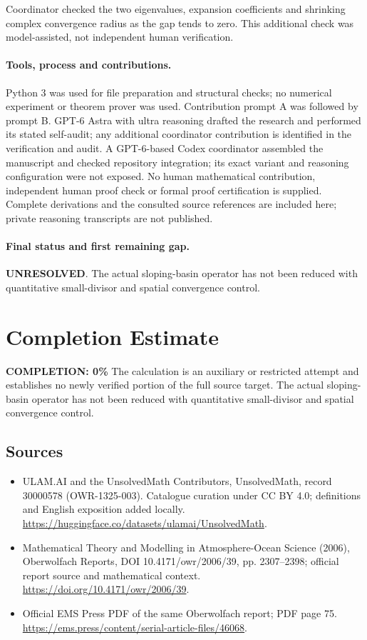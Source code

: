 \documentclass[11pt]{article}
\begin{document}
Coordinator checked the two eigenvalues, expansion coefficients and shrinking complex convergence radius as the gap tends to zero. This additional check was model-assisted, not independent human verification.

\paragraph{Tools, process and contributions.}
Python 3 was used for file preparation and structural checks; no numerical experiment or theorem prover was used. Contribution prompt A was followed by prompt B. GPT-6 Astra with ultra reasoning drafted the research and performed its stated self-audit; any additional coordinator contribution is identified in the verification and audit. A GPT-6-based Codex coordinator assembled the manuscript and checked repository integration; its exact variant and reasoning configuration were not exposed. No human mathematical contribution, independent human proof check or formal proof certification is supplied. Complete derivations and the consulted source references are included here; private reasoning transcripts are not published.

\paragraph{Final status and first remaining gap.}
\textbf{UNRESOLVED}. The actual sloping-basin operator has not been reduced with quantitative small-divisor and spatial convergence control.

\section{Completion Estimate}
\noindent\textbf{COMPLETION: 0\%}
The calculation is an auxiliary or restricted attempt and establishes no newly verified portion of the full source target. The actual sloping-basin operator has not been reduced with quantitative small-divisor and spatial convergence control.

\subsection{Sources}
\begin{itemize}
\item[\hypertarget{source:30000578:1}{S1}] ULAM.AI and the UnsolvedMath Contributors, UnsolvedMath, record 30000578 (OWR-1325-003). Catalogue curation under CC BY 4.0; definitions and English exposition added locally.
\url{https://huggingface.co/datasets/ulamai/UnsolvedMath}.
\item[\hypertarget{source:30000578:2}{S2}] Mathematical Theory and Modelling in Atmosphere-Ocean Science (2006), Oberwolfach Reports, DOI 10.4171/owr/2006/39, pp. 2307--2398; official report source and mathematical context.
\url{https://doi.org/10.4171/owr/2006/39}.
\item[\hypertarget{source:30000578:3}{S3}] Official EMS Press PDF of the same Oberwolfach report; PDF page 75.
\url{https://ems.press/content/serial-article-files/46068}.
\end{itemize}
\label{end:30000578}
\end{document}
